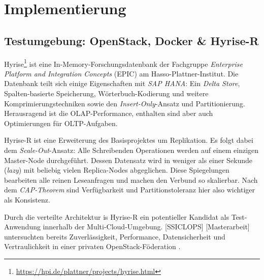 \chapter{Implementierung}
\label{cha:implementierung}


\section{Testumgebung: OpenStack, Docker \& Hyrise-R}

Hyrise\footnote{\url{https://hpi.de/plattner/projects/hyrise.html}} ist eine In-Memory-Forschungsdatenbank der Fachgruppe \emph{Enterprise Platform and Integration Concepts} (EPIC) am Hasso-Plattner-Institut. Die Datenbank teilt sich einige Eigenschaften mit \emph{SAP HANA}: Ein \emph{Delta Store}, Spalten-basierte Speicherung, Wörterbuch-Kodierung und weitere Komprimierungstechniken sowie den \emph{Insert-Only}-Ansatz und Partitionierung. Herausragend ist die OLAP-Performance, enthalten sind aber auch Optimierungen für OLTP-Aufgaben.


Hyrise-R ist eine Erweiterung des Basisprojektes um Replikation. Es folgt dabei dem \emph{Scale-Out}-Ansatz: Alle Schreibenden Operationen werden auf einem einzigen Master-Node durchgeführt. Dessen Datensatz wird in weniger als einer Sekunde (\emph{lazy}) mit beliebig vielen Replica-Nodes abgeglichen. Diese Spiegelungen bearbeiten alle reinen Leseanfragen und machen den Verbund so skalierbar. Nach dem \emph{CAP-Theorem} sind Verfügbarkeit und Partitionstoleranz hier also wichtiger als Konsistenz.

Durch die verteilte Architektur is Hyrise-R ein potentieller Kandidat als Test-Anwendung innerhalb der Multi-Cloud-Umgebung. [SSICLOPS] [Masterarbeit] untersuchten bereits Zuverlässigkeit, Performance, Datensicherheit und Vertraulichkeit in einer privaten OpenStack-Föderation . 

